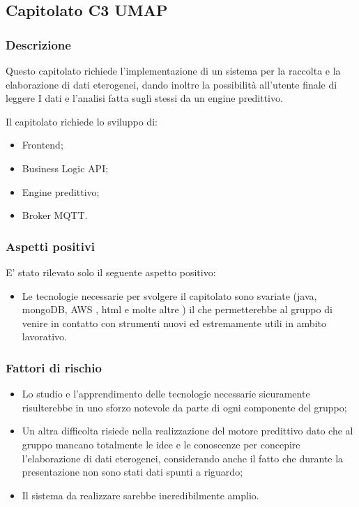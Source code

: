 \documentclass[12pt,a4paper]{article}
\begin{document}
\newpage
\subsection{Capitolato C3 UMAP}

\subsubsection{Descrizione}

Questo capitolato richiede l'implementazione di un sistema per la  raccolta e la elaborazione di dati eterogenei, dando inoltre la possibilità all'utente finale di leggere I dati e l'analisi fatta sugli stessi da un engine predittivo.

Il capitolato richiede lo sviluppo di:
\begin{itemize}
\item Frontend;
\item Business Logic API; 
\item Engine predittivo;
\item Broker MQTT. 
\end{itemize}

\subsubsection{Aspetti positivi}

E' stato rilevato solo il seguente aspetto positivo:

\begin{itemize}
\item	Le tecnologie necessarie per svolgere il capitolato sono svariate (java, mongoDB, AWS , html e molte altre ) il che permetterebbe al gruppo di venire in contatto con strumenti nuovi ed estremamente utili in ambito lavorativo.
\end{itemize}

\subsubsection{Fattori di rischio}

\begin{itemize}
\item	Lo studio e l'apprendimento delle tecnologie necessarie sicuramente risulterebbe in uno sforzo notevole da parte di ogni componente del gruppo;

\item	Un altra difficolta risiede nella realizzazione del motore predittivo dato che al gruppo mancano totalmente le idee e le conoscenze per concepire l'elaborazione di dati eterogenei, considerando anche il fatto che durante la presentazione non sono	stati dati spunti a riguardo;
\item	Il sistema da realizzare sarebbe incredibilmente amplio.
\end{itemize}
\end{document}
